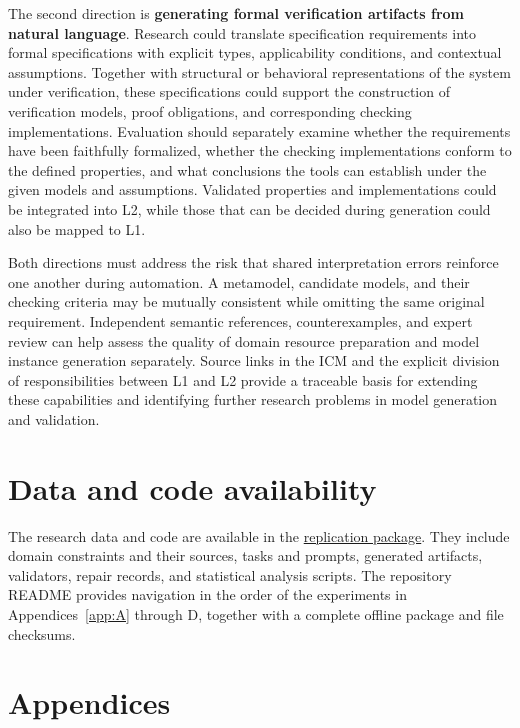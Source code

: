 \documentclass[pdflatex,iicol,sn-mathphys-num]{sn-jnl}
\begin{document}
The second direction is \textbf{generating formal verification artifacts from natural language}. Research could translate specification requirements into formal specifications with explicit types, applicability conditions, and contextual assumptions. Together with structural or behavioral representations of the system under verification, these specifications could support the construction of verification models, proof obligations, and corresponding checking implementations. Evaluation should separately examine whether the requirements have been faithfully formalized, whether the checking implementations conform to the defined properties, and what conclusions the tools can establish under the given models and assumptions. Validated properties and implementations could be integrated into L2, while those that can be decided during generation could also be mapped to L1.

Both directions must address the risk that shared interpretation errors reinforce one another during automation. A metamodel, candidate models, and their checking criteria may be mutually consistent while omitting the same original requirement. Independent semantic references, counterexamples, and expert review can help assess the quality of domain resource preparation and model instance generation separately. Source links in the ICM and the explicit division of responsibilities between L1 and L2 provide a traceable basis for extending these capabilities and identifying further research problems in model generation and validation.

\section*{Data and code availability}\label{sec:data-availability}

The research data and code are available in the \href{https://github.com/Abandooon/AI_XmlGenerator/tree/ATLAS}{replication package}. They include domain constraints and their sources, tasks and prompts, generated artifacts, validators, repair records, and statistical analysis scripts. The repository README provides navigation in the order of the experiments in Appendices~\ref{app:A} through D, together with a complete offline package and file checksums.

\FloatBarrier



\appendix

\section*{Appendices}
\end{document}
